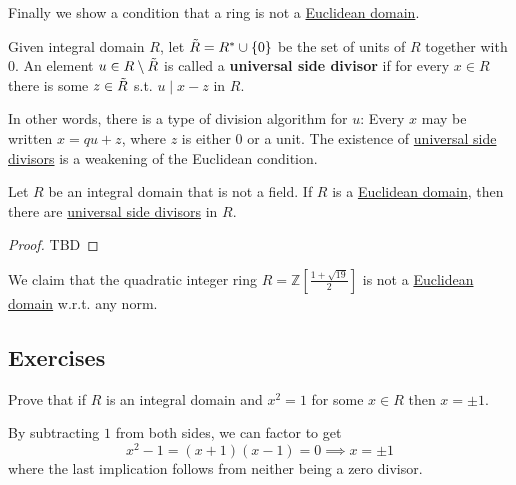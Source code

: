   Finally we show a condition that a ring is not a \hyperref[def:euclidean-domain]{Euclidean domain}. 

  \begin{definition}
    \label{def:universal-side-divisor}
    Given integral domain $R$, let $\Tilde{R} = R^\ast \cup \{0\}$ be the set of units of $R$ together with $0$. An element $u \in R \setminus \Tilde{R}$ is called a \textbf{universal side divisor} if for every $x \in R$ there is some $z \in \Tilde{R}$ s.t. $u \mid x - z$ in $R$. 
  \end{definition}

  In other words, there is a type of division algorithm for $u$: Every $x$ may be written $x = qu + z$, where $z$ is either $0$ or a unit. The existence of \hyperref[def:universal-side-divisor]{universal side divisors} is a weakening of the Euclidean condition. 

  \begin{theorem}
    \label{thm:euclidean-domains-contain-universal-side}
    Let $R$ be an integral domain that is not a field. If $R$ is a \hyperref[def:euclidean-domain]{Euclidean domain}, then there are \hyperref[def:universal-side-divisor]{universal side divisors} in $R$. 
  \end{theorem}
  \begin{proof}
    TBD
  \end{proof}

  \begin{example}[]
    \label{ex:claim-quadratic-integer-ring-not}
    We claim that the quadratic integer ring $R = \mathbb{Z}[\frac{1 + \sqrt{19}}{2}]$ is not a \hyperref[def:euclidean-domain]{Euclidean domain} w.r.t. any norm. 
  \end{example}

\subsection{Exercises}

  \begin{exercise}[Dummit 7.1.11]
    Prove that if $R$ is an integral domain and $x^2 = 1$ for some $x \in R$ then $x = \pm 1$. 
  \end{exercise}
  \begin{solution}
    By subtracting $1$ from both sides, we can factor to get 
    \begin{equation}
      x^2 - 1 = (x + 1) (x - 1) = 0 \implies x = \pm 1
    \end{equation}
    where the last implication follows from neither being a zero divisor. 
  \end{solution}

